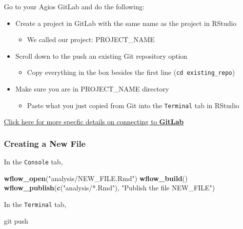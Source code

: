 \documentclass[openany]{book}
\newenvironment{Shaded}{\begin{snugshade}}{\end{snugshade}}
\newcommand{\KeywordTok}[1]{\textcolor[rgb]{0.13,0.29,0.53}{\textbf{#1}}}
\newcommand{\NormalTok}[1]{#1}
\newcommand{\StringTok}[1]{\textcolor[rgb]{0.31,0.60,0.02}{#1}}
\providecommand{\tightlist}{%
  \setlength{\itemsep}{0pt}\setlength{\parskip}{0pt}}
\begin{document}
Go to your Agios GitLab and do the following:

\begin{itemize}
\tightlist
\item
  Create a project in GitLab with the same name as the project in RStudio

  \begin{itemize}
  \tightlist
  \item
    We called our project: PROJECT\_NAME
  \end{itemize}
\item
  Scroll down to the push an existing Git repository option

  \begin{itemize}
  \tightlist
  \item
    Copy everything in the box besides the first line (\texttt{cd\ existing\_repo})
  \end{itemize}
\item
  Make sure you are in PROJECT\_NAME directory

  \begin{itemize}
  \tightlist
  \item
    Paste what you just copied from Git into the \texttt{Terminal} tab in RStudio
  \end{itemize}
\end{itemize}

\protect\hyperlink{connecting-to-gitlab-1}{Click here for more specfic details on connecting to \textbf{GitLab}}

\hypertarget{creating-a-new-file}{%
\subsubsection{Creating a New File}\label{creating-a-new-file}}

In the \texttt{Console} tab,

\begin{Shaded}
\begin{Highlighting}[]
\KeywordTok{wflow_open}\NormalTok{(}\StringTok{"analysis/NEW_FILE.Rmd"}\NormalTok{)}
\KeywordTok{wflow_build}\NormalTok{()}
\KeywordTok{wflow_publish}\NormalTok{(}\KeywordTok{c}\NormalTok{(}\StringTok{"analysis/*.Rmd"}\NormalTok{), }\StringTok{"Publish the file NEW_FILE"}\NormalTok{)}
\end{Highlighting}
\end{Shaded}

In the \texttt{Terminal} tab,

\begin{Shaded}
\begin{Highlighting}[]
\NormalTok{git push}
\end{Highlighting}
\end{Shaded}
\end{document}
